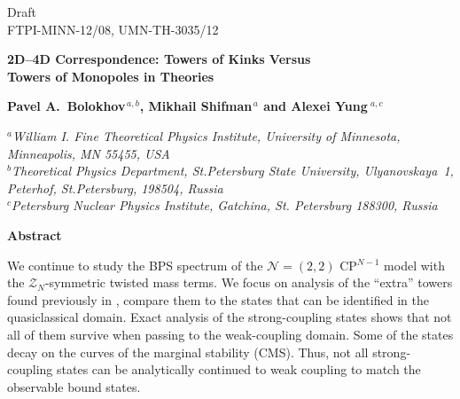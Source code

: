 \documentclass[epsfig,12pt]{article}
\newcommand{\mc}[1]{\mathcal{#1}}
\begin{document}



\begin{titlepage}

\begin{flushright}
Draft\\
%
FTPI-MINN-12/08, UMN-TH-3035/12\\
\end{flushright}

\vspace{0.3cm}

\begin{center}
{  \Large \bf  
			2D--4D Correspondence: Towers of Kinks Versus\\[1mm]  
			Towers of Monopoles
			in  Theories
			
}
\end{center}
\vspace{0.6cm}

\begin{center}

 {\large
 \bf   Pavel A.~Bolokhov$^{\,a,b}$,  Mikhail Shifman$^{\,a}$ and Alexei Yung$^{\,\,a,c}$}
\end {center}

\begin{center}

$^a${\it  William I. Fine Theoretical Physics Institute, University of Minnesota,
Minneapolis, MN 55455, USA}\\
$^b${\it Theoretical Physics Department, St.Petersburg State University, Ulyanovskaya~1, 
	 Peterhof, St.Petersburg, 198504, Russia}\\
$^{c}${\it Petersburg Nuclear Physics Institute, Gatchina, St. Petersburg
188300, Russia
}


\vspace{0.7cm}


{\large\bf Abstract}
\end{center}

	We continue to study the BPS spectrum of the ${\mathcal N}=(2,2)$ CP$^{N-1}$ model  with 
	the $ \mc{Z}_N $-symmetric twisted mass terms.
	We focus on analysis of the ``extra'' towers found previously in \cite{Bolokhov:2011mp},
	compare them to the states that can be identified in the quasiclassical domain.
	Exact analysis of the strong-coupling states shows that not all of them survive when passing to the
	weak-coupling domain. 
	Some of the states decay on the curves of the marginal stability (CMS).
	Thus, not all strong-coupling states can be analytically continued to weak coupling 
	to match the observable bound states.
	

\end{titlepage}
\end{document}
